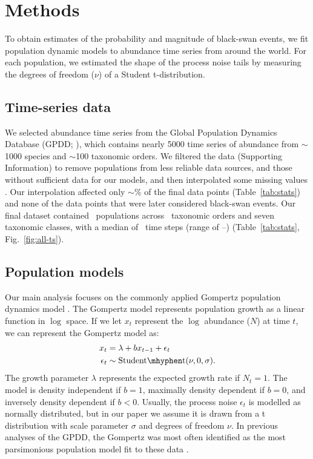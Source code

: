 \section{Methods}

To obtain estimates of the probability and magnitude of black-swan events, we
fit population dynamic models to abundance time series from around the world.
For each population, we estimated the shape of the process noise tails by
measuring the degrees of freedom ($\nu$) of a Student t-distribution.

\subsection{Time-series data}

We selected abundance time series from the Global Population Dynamics Database
(GPDD; \citeauthor{gpdd2010} \citeyear{gpdd2010}), which contains nearly 5000
time series of abundance from $\sim$1000 species and $\sim$100 taxonomic
orders. We filtered the data (Supporting Information) to remove populations
from less reliable data sources, and those without sufficient data for our
models, and then interpolated some missing values
\citep[\textit{sensu}][]{brook2006a}. Our interpolation affected only
$\sim$\interpPointsPerc \% of the final data points (Table~\ref{tab:stats})
and none of the data points that were later considered black-swan events. Our
final dataset contained \NPops~populations across \NOrders~taxonomic orders
and seven taxonomic classes, with a median of \medianTimeSteps~time steps
(range of \minTimeSteps--\maxTimeSteps) (Table~\ref{tab:stats},
Fig.~\ref{fig:all-ts}).

\subsection{Population models}

Our main analysis focuses on the commonly applied Gompertz population dynamics
model \citep[e.g.][]{knape2012,dennis2014,connors2014}. The Gompertz model
represents population growth as a linear function in $\log$ space. If we let
$x_t$ represent the $\log$ abundance ($N$) at time $t$, we can represent the
Gompertz model as:
\begin{align*}
x_t &= \lambda + b x_{t-1} + \epsilon_t\\
\epsilon_t &\sim \mathrm{Student\mhyphen t}(\nu, 0, \sigma).
\end{align*}
The growth parameter $\lambda$ represents the expected growth rate if $N_t =
1$. The model is density independent if $b = 1$, maximally density dependent
if $b = 0$, and inversely density dependent if $b < 0$. Usually, the process
noise $\epsilon_t$ is modelled as normally distributed, but in our paper we
assume it is drawn from a t distribution with scale parameter $\sigma$ and
degrees of freedom $\nu$. In previous analyses of the GPDD, the Gompertz was
most often identified as the most parsimonious population model fit to these
data \citep{brook2006}.

